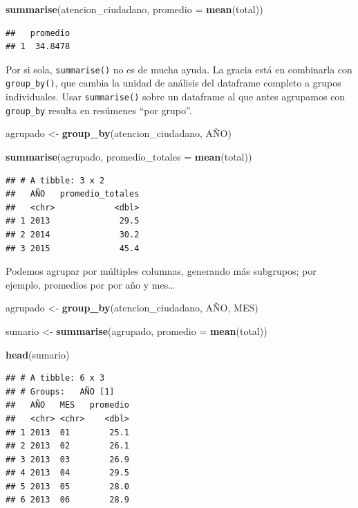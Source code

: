 \documentclass[]{book}
\newenvironment{Shaded}{\begin{snugshade}}{\end{snugshade}}
\newcommand{\KeywordTok}[1]{\textcolor[rgb]{0.13,0.29,0.53}{\textbf{#1}}}
\newcommand{\DataTypeTok}[1]{\textcolor[rgb]{0.13,0.29,0.53}{#1}}
\newcommand{\StringTok}[1]{\textcolor[rgb]{0.31,0.60,0.02}{#1}}
\newcommand{\NormalTok}[1]{#1}
\begin{document}
\begin{Shaded}
\begin{Highlighting}[]
\KeywordTok{summarise}\NormalTok{(atencion_ciudadano, }\DataTypeTok{promedio =} \KeywordTok{mean}\NormalTok{(total))}
\end{Highlighting}
\end{Shaded}

\begin{verbatim}
##   promedio
## 1  34.8478
\end{verbatim}

Por si sola, \texttt{summarise()} no es de mucha ayuda. La gracia está
en combinarla con \texttt{group\_by()}, que cambia la unidad de análisis
del dataframe completo a grupos individuales. Usar \texttt{summarise()}
sobre un dataframe al que antes agrupamos con \texttt{group\_by} resulta
en resúmenes ``por grupo''.

\begin{Shaded}
\begin{Highlighting}[]
\NormalTok{agrupado <-}\StringTok{ }\KeywordTok{group_by}\NormalTok{(atencion_ciudadano, AÑO)}

\KeywordTok{summarise}\NormalTok{(agrupado, }\DataTypeTok{promedio_totales =} \KeywordTok{mean}\NormalTok{(total))}
\end{Highlighting}
\end{Shaded}

\begin{verbatim}
## # A tibble: 3 x 2
##   AÑO   promedio_totales
##   <chr>            <dbl>
## 1 2013              29.5
## 2 2014              30.2
## 3 2015              45.4
\end{verbatim}

Podemos agrupar por múltiples columnas, generando más subgrupos; por
ejemplo, promedios por por año y mes\ldots{}

\begin{Shaded}
\begin{Highlighting}[]
\NormalTok{agrupado <-}\StringTok{ }\KeywordTok{group_by}\NormalTok{(atencion_ciudadano, AÑO, MES)}

\NormalTok{sumario <-}\StringTok{ }\KeywordTok{summarise}\NormalTok{(agrupado, }\DataTypeTok{promedio =} \KeywordTok{mean}\NormalTok{(total))}

\KeywordTok{head}\NormalTok{(sumario)}
\end{Highlighting}
\end{Shaded}

\begin{verbatim}
## # A tibble: 6 x 3
## # Groups:   AÑO [1]
##   AÑO   MES   promedio
##   <chr> <chr>    <dbl>
## 1 2013  01        25.1
## 2 2013  02        26.1
## 3 2013  03        26.9
## 4 2013  04        29.5
## 5 2013  05        28.0
## 6 2013  06        28.9
\end{verbatim}
\end{document}
